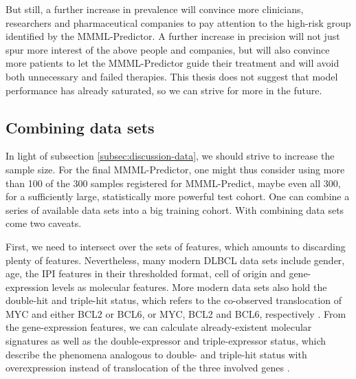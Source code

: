 But still, a further increase in prevalence will convince more clinicians, researchers 
and pharmaceutical companies to pay attention to the high-risk group identified by the MMML-Predictor.
A further increase in precision will not just spur more interest of the above people and 
companies, but will also convince more patients to let the MMML-Predictor guide their treatment and 
will avoid both unnecessary and failed therapies. This thesis does not suggest that model performance 
has already saturated, so we can strive for more in the future.

\subsection{Combining data sets}

In light of subsection \ref{subsec:discussion-data}, we should strive to increase the sample size.
For the final MMML-Predictor, one might thus consider using more than \num{100} of the \num{300} 
samples registered for MMML-Predict, maybe even all \num{300}, for a sufficiently large, 
statistically more powerful test cohort. One can combine a series of available data sets into a 
big training cohort. With combining data sets come two caveats. 

First, we need to intersect over the sets of features, which amounts to discarding plenty 
of features. Nevertheless, many modern DLBCL data sets include gender, age, the IPI features in 
their thresholded format, cell of origin and gene-expression levels as molecular features. More 
modern data sets also hold the double-hit and triple-hit status, which refers to the co-observed 
translocation of MYC and either BCL2 or BCL6, or MYC, BCL2 and BCL6, respectively \cite{aukema11}. 
From the gene-expression features, we can calculate already-existent molecular signatures as well 
as the double-expressor and triple-expressor status, which describe the phenomena analogous to 
double- and triple-hit status with overexpression instead of translocation of the three involved 
genes \cite{horn13}.

